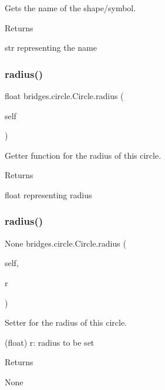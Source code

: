 Gets the name of the shape/symbol. 

\begin{DoxyReturn}{Returns}


str representing the name 
\end{DoxyReturn}
\mbox{\label{classbridges_1_1circle_1_1_circle_a6903e60b2342b366d456217756018f4f}} 
\subsubsection{\texorpdfstring{radius()}{radius()}\hspace{0.1cm}{\footnotesize\ttfamily [1/2]}}
{\footnotesize\ttfamily  float bridges.\+circle.\+Circle.\+radius (\begin{DoxyParamCaption}\item[{}]{self }\end{DoxyParamCaption})}



Getter function for the radius of this circle. 

\begin{DoxyReturn}{Returns}


float representing radius 
\end{DoxyReturn}
\mbox{\label{classbridges_1_1circle_1_1_circle_a4048e6ffd463e53ec4eec43695240dc8}} 
\subsubsection{\texorpdfstring{radius()}{radius()}\hspace{0.1cm}{\footnotesize\ttfamily [2/2]}}
{\footnotesize\ttfamily  None bridges.\+circle.\+Circle.\+radius (\begin{DoxyParamCaption}\item[{}]{self,  }\item[{}]{r }\end{DoxyParamCaption})}



Setter for the radius of this circle. 

\begin{DoxyVerb}       (float) r: radius to be set
\end{DoxyVerb}
 \begin{DoxyReturn}{Returns}


None
\end{DoxyReturn}

